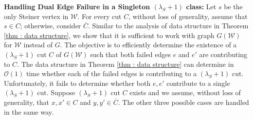 \documentclass[letterpaper,11pt]{article}
\begin{document}
\noindent
\textbf{Handling Dual Edge Failure in a Singleton $(\lambda_S+1)$ class:} Let $s$ be the only Steiner vertex in ${\mathcal W}$. For every cut $C$, without loss of generality, assume that $s\in C$; otherwise, consider $\overline{C}$. Similar to the analysis of data structure in Theorem \ref{thm : data structure}, we show that it is sufficient to work with graph $G({\mathcal W})$ for ${\mathcal W}$ instead of $G$. 
The objective is to efficiently determine the existence of a $(\lambda_S+1)$ cut $C$ of $G({\mathcal W})$ such that both failed edges $e$ and $e'$ are contributing to $C$. The data structure in Theorem \ref{thm : data structure} can determine in ${\mathcal O}(1)$ time whether each of the failed edges is contributing to a $(\lambda_S+1)$ cut. Unfortunately, it fails to determine whether both $e,e'$ contribute to a single $(\lambda_S+1)$ cut. Suppose $(\lambda_S+1)$ cut $C$ exists and we assume, without loss of generality, that $x,x'\in C$ and $y,y'\in \overline{C}$.
The other three possible cases are handled in the same way.
\end{document}
